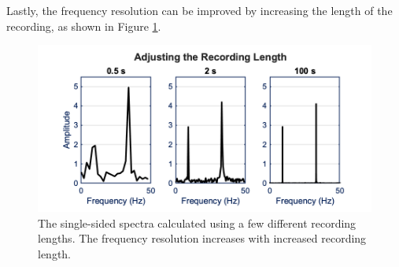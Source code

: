 Lastly, the frequency resolution can be improved by increasing the length of the recording, as shown in Figure \ref{fig:Adjusting the Recording Length for FFT}.

\begin{figure}[H]
    \centering
    \includegraphics[width = 6 in]{Chapters/Signal Processing/Figures/Adjusting the Recording Length.png}
    \caption{The single-sided spectra calculated using a few different recording lengths. The frequency resolution increases with increased recording length.}
    \label{fig:Adjusting the Recording Length for FFT}
\end{figure}